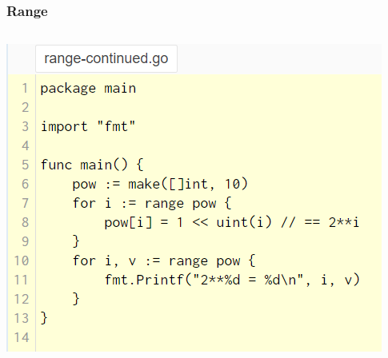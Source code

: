 \documentclass[14pt]{beamer}
\begin{document}
{
\begin{frame}
    \frametitle{Range}
    \begin{columns}
        \begin{column}{0.7\textwidth}
        \includegraphics[width=\linewidth]{img/range.PNG}
        \end{column}
        \begin{column}{0.3\textwidth}

\end{column}
\end{columns}
\end{frame}}
\end{document}
